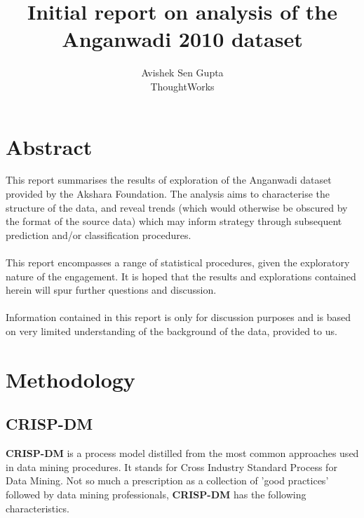 \documentclass[10pt]{article}
\begin{document}
\fancyfoot{}
\title{\textbf{Initial report on analysis of the Anganwadi 2010 dataset}} 
\author{Avishek Sen Gupta\\ThoughtWorks\\}
\maketitle
\thispagestyle{fancy}

\newpage
\fancyfoot{}
\pagestyle{fancy}
\fancyfoot[CO,CE]{\thepage}

\tableofcontents
\listoffigures
\listoftables
\newpage
\section{Abstract}
This report summarises the results of exploration of the Anganwadi dataset provided by the Akshara Foundation. The analysis aims to characterise the structure of the data, and reveal trends (which would otherwise be obscured by the format of the source data) which may inform strategy through subsequent prediction and/or classification procedures.\\\\
This report encompasses a range of statistical procedures, given the exploratory nature of the engagement. It is hoped that the results and explorations contained herein will spur further questions and discussion.\\\\
Information contained in this report is only for discussion purposes and is based on very limited understanding of the background of the data, provided to us.

\newpage
\section{Methodology}
\subsection{CRISP-DM}
\textbf{CRISP-DM} is a process model distilled from the most common approaches used in data mining procedures. It stands for Cross Industry Standard Process for Data Mining. Not so much a prescription as a collection of 'good practices' followed by data mining professionals, \textbf{CRISP-DM} has the following characteristics.
\end{document}
